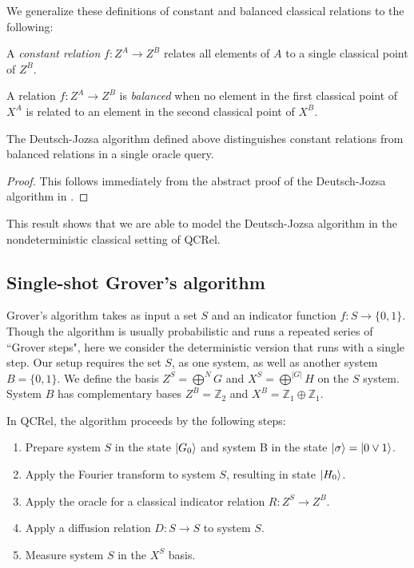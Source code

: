 We generalize these definitions of constant and balanced classical relations to the following:
\begin{definition}
\label{def:const}
A \emph{constant relation} $f:Z^{A}\to Z^{B}$ relates all elements of $A$ to a single classical point of $Z^B$.
\end{definition}

\begin{definition}
\label{def:balanced}
A relation $f:Z^{A}\to Z^{B}$ is \emph{balanced} when no element in the first classical point of $X^{A}$ is related to an element in the second classical point of $X^{B}$.
\end{definition}

\begin{theorem}
\label{thm:dj_speedup}
The Deutsch-Jozsa algorithm defined above distinguishes constant relations from balanced relations in a single oracle query.
\end{theorem}
\begin{proof}
This follows immediately from the abstract proof of the Deutsch-Jozsa algorithm in \cite{vicary-tqa}.
\end{proof}

This result shows that we are able to model the Deutsch-Jozsa algorithm in the nondeterministic classical setting of QCRel.

\subsection{Single-shot Grover's algorithm}

Grover's algorithm \cite{grover1996fast} takes as input a set $S$ and an indicator function $f:S\to\{0,1\}$. Though the algorithm is usually probabilistic and runs a repeated series of ``Grover steps", here we consider the deterministic version that runs with a single step. Our setup requires the set $S$, as one system, as well as another system $B=\{0,1\}$. We define the basis $Z^{S}=\bigoplus^NG$ and $X^S=\bigoplus^{|G|}H$ on the $S$ system.  System $B$ has complementary bases $Z^B=\mathbb{Z}_2$ and $X^B=\mathbb{Z}_1\oplus\mathbb{Z}_1$.

In QCRel, the algorithm proceeds by the following steps:
\begin{enumerate}
\item Prepare system $S$ in the state $| G_0 \rangle$ and system B in the state $| \sigma \rangle = | 0\vee 1 \rangle$.

\item Apply the Fourier transform to system $S$, resulting in state $| H_0 \rangle$.

\item Apply the oracle for a classical indicator relation $R:Z^S\to Z^B$.

\item Apply a diffusion relation $D:S\to S$ to system $S$.

\item Measure system $S$ in the $X^S$ basis.

\end{enumerate}


